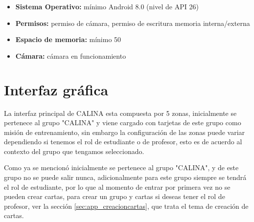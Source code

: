 \begin{itemize}
	\item \textbf{Sistema Operativo:} mínimo Android 8.0 (nivel de API 26)
	\item \textbf{Permisos:} permiso de cámara, permiso de escritura memoria interna/externa
	\item \textbf{Espacio de memoria:} mínimo \qty{50}{\mega\byte}
	\item \textbf{Cámara:} cámara en funcionamiento
\end{itemize}

\section{Interfaz gráfica}

La interfaz principal de CALINA esta compuesta por 5 zonas, inicialmente se pertenece al grupo "CALINA" y 
viene cargado con tarjetas de este grupo como misión de entrenamiento, sin embargo la configuración de las 
zonas puede variar dependiendo si tenemos el rol de estudiante o de profesor, esto es de acuerdo al contexto 
del grupo que tengamos seleccionado.

Como ya se mencionó inicialmente se pertenece al grupo "CALINA", y de este grupo no se puede salir nunca, 
adicionalmente para este grupo siempre se tendrá el rol de estudiante, por lo que al momento de entrar por 
primera vez no se pueden crear cartas, para crear un grupo y cartas si deseas tener el rol de profesor, ver la 
sección \ref{sec:app_creacioncartas}, que trata el tema de creación de cartas.

